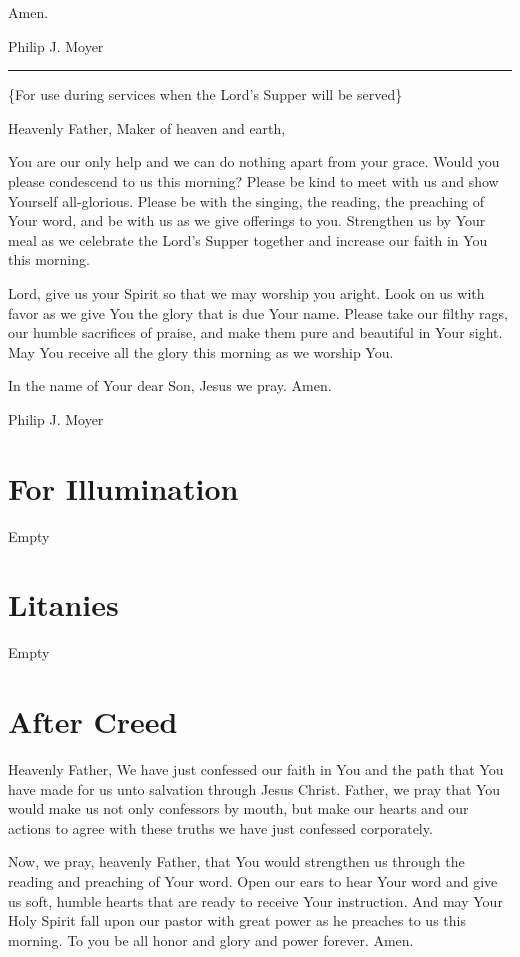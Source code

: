 \documentclass[]{book}
\begin{document}
Amen.

Philip J. Moyer

\begin{center}\rule{0.5\linewidth}{\linethickness}\end{center}

\{For use during services when the Lord's Supper will be served\}

Heavenly Father, Maker of heaven and earth,

You are our only help and we can do nothing apart from your grace. Would
you please condescend to us this morning? Please be kind to meet with us
and show Yourself all-glorious. Please be with the singing, the reading,
the preaching of Your word, and be with us as we give offerings to you.
Strengthen us by Your meal as we celebrate the Lord's Supper together
and increase our faith in You this morning.

Lord, give us your Spirit so that we may worship you aright. Look on us
with favor as we give You the glory that is due Your name. Please take
our filthy rags, our humble sacrifices of praise, and make them pure and
beautiful in Your sight. May You receive all the glory this morning as
we worship You.

In the name of Your dear Son, Jesus we pray. Amen.

Philip J. Moyer

\section{For Illumination}\label{for-illumination}

Empty

\section{Litanies}\label{litanies}

Empty

\section{After Creed}\label{after-creed}

Heavenly Father, We have just confessed our faith in You and the path
that You have made for us unto salvation through Jesus Christ. Father,
we pray that You would make us not only confessors by mouth, but make
our hearts and our actions to agree with these truths we have just
confessed corporately.

Now, we pray, heavenly Father, that You would strengthen us through the
reading and preaching of Your word. Open our ears to hear Your word and
give us soft, humble hearts that are ready to receive Your instruction.
And may Your Holy Spirit fall upon our pastor with great power as he
preaches to us this morning. To you be all honor and glory and power
forever. Amen.
\end{document}
